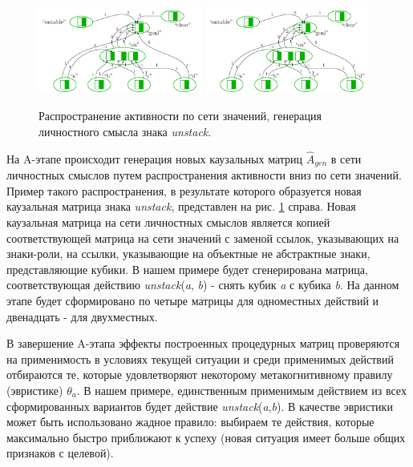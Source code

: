 \documentclass[12pt]{report}
\begin{document}
	\begin{figure}
		\centering
		\includegraphics[width=0.48\textwidth,page=5]{examples/plan/plan_nets}
		\includegraphics[width=0.48\textwidth,page=4]{examples/plan/plan_nets}
		\caption{Распространение активности по сети значений, генерация личностного смысла знака \textit{unstack}.}	
		\label{fig:unstack_gen}	
	\end{figure}
	
	На A-этапе происходит генерация новых каузальных матриц $\hat A_{gen}$ в сети личностных смыслов путем распространения активности вниз по сети значений. Пример такого распространения, в результате которого образуется новая каузальная матрица знака \textit{unstack}, представлен на рис. \ref{fig:unstack_gen} справа. Новая каузальная матрица на сети личностных смыслов является копией соответствующей матрица на сети значений с заменой ссылок, указывающих на знаки-роли, на ссылки, указывающие на объектные не абстрактные знаки, представляющие кубики. В нашем примере будет сгенерирована матрица, соответствующая действию \textit{unstack}(\textit{a}, \textit{b}) - снять кубик \textit{a} с кубика \textit{b}. На данном этапе будет сформировано по четыре матрицы для одноместных действий и двенадцать - для двухместных.
	
	В завершение A-этапа эффекты построенных процедурных матриц проверяются на применимость в условиях текущей ситуации и среди применимых действий отбираются те, которые удовлетворяют некоторому метакогнитивному правилу (эвристике) $\theta_a$. В нашем примере, единственным применимым действием из всех сформированных вариантов будет действие \textit{unstack}(\textit{a},\textit{b}). В качестве эвристики может быть использовано жадное правило: выбираем те действия, которые максимально быстро приближают к успеху (новая ситуация имеет больше общих признаков с целевой).
	
\end{document}
